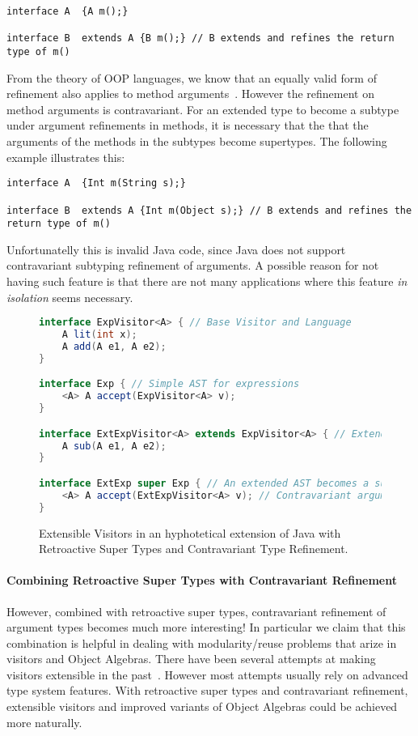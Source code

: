 \begin{lstlisting}
interface A  {A m();} 

interface B  extends A {B m();} // B extends and refines the return type of m()
\end{lstlisting}

\noindent From the theory of OOP languages, we know that an equally
valid form of refinement also applies to method arguments~\cite{}. However 
the refinement on method arguments is contravariant. For an
extended type to become a subtype under argument refinements in
methods, it is necessary that the  that the arguments of the methods
in the subtypes become supertypes. The following example illustrates 
this: 

\begin{lstlisting}
interface A  {Int m(String s);} 

interface B  extends A {Int m(Object s);} // B extends and refines the return type of m()
\end{lstlisting}

\noindent Unfortunatelly this is invalid Java code, since Java 
does not support contravariant subtyping refinement of arguments. 
A possible reason for not having such feature is that there are not
many applications where this feature \emph{in isolation} seems necessary. 

\begin{figure}
\begin{lstlisting}[language=java]
interface ExpVisitor<A> { // Base Visitor and Language
	A lit(int x);
	A add(A e1, A e2);
}

interface Exp { // Simple AST for expressions
	<A> A accept(ExpVisitor<A> v);
}

interface ExtExpVisitor<A> extends ExpVisitor<A> { // Extended Visitor and Language
	A sub(A e1, A e2);
}

interface ExtExp super Exp { // An extended AST becomes a supertype of the original one
	<A> A accept(ExtExpVisitor<A> v); // Contravariant argument refinement
}
\end{lstlisting}
\caption{Extensible Visitors in an hyphotetical
  extension of Java with Retroactive Super Types and Contravariant
  Type Refinement.}
\label{fig:JVis}
\end{figure}

\paragraph{Combining Retroactive Super Types with Contravariant Refinement}
However, combined with retroactive super types, contravariant
refinement of argument types becomes 
much more interesting! In particular we claim that this combination is 
helpful in dealing with modularity/reuse problems that arize in
visitors and Object Algebras. There have been several attempts 
at making visitors extensible in the past~\cite{}. However most
attempts usually rely on advanced type system features. With retroactive super
types and contravariant refinement, extensible visitors and improved
variants of Object Algebras could be achieved more naturally.  

